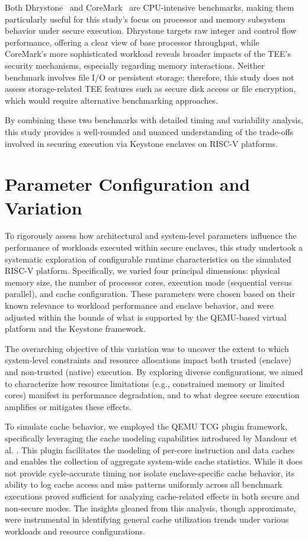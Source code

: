 Both Dhrystone~\cite{weiss2002dhrystone} and CoreMark~\cite{gal2012exploring} are CPU-intensive benchmarks, making them particularly useful for this study’s focus on processor and memory subsystem behavior under secure execution. Dhrystone targets raw integer and control flow performance, offering a clear view of base processor throughput, while CoreMark’s more sophisticated workload reveals broader impacts of the TEE’s security mechanisms, especially regarding memory interactions. Neither benchmark involves file I/O or persistent storage; therefore, this study does not assess storage-related TEE features such as secure disk access or file encryption, which would require alternative benchmarking approaches.

By combining these two benchmarks with detailed timing and variability analysis, this study provides a well-rounded and nuanced understanding of the trade-offs involved in securing execution via Keystone enclaves on RISC-V platforms.

\section{Parameter Configuration and Variation}
\label{sec:param-variation}

To rigorously assess how architectural and system-level parameters influence the performance of workloads executed within secure enclaves, this study undertook a systematic exploration of configurable runtime characteristics on the simulated RISC-V platform. Specifically, we varied four principal dimensions: physical memory size, the number of processor cores, execution mode (sequential versus parallel), and cache configuration. These parameters were chosen based on their known relevance to workload performance and enclave behavior, and were adjusted within the bounds of what is supported by the QEMU-based virtual platform and the Keystone framework.

The overarching objective of this variation was to uncover the extent to which system-level constraints and resource allocations impact both trusted (enclave) and non-trusted (native) execution. By exploring diverse configurations, we aimed to characterize how resource limitations (e.g., constrained memory or limited cores) manifest in performance degradation, and to what degree secure execution amplifies or mitigates these effects.

To simulate cache behavior, we employed the QEMU TCG plugin framework, specifically leveraging the cache modeling capabilities introduced by Mandour et al. \cite{mandour2021cache}. This plugin facilitates the modeling of per-core instruction and data caches and enables the collection of aggregate system-wide cache statistics. While it does not provide cycle-accurate timing nor isolate enclave-specific cache behavior, its ability to log cache access and miss patterns uniformly across all benchmark executions proved sufficient for analyzing cache-related effects in both secure and non-secure modes. The insights gleaned from this analysis, though approximate, were instrumental in identifying general cache utilization trends under various workloads and resource configurations.

